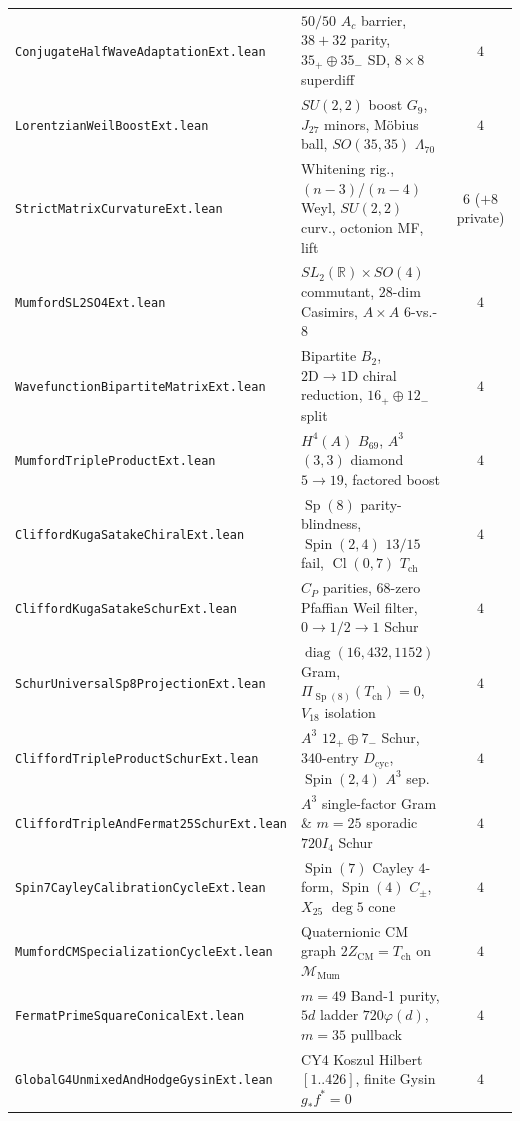 \documentclass[11pt,a4paper]{article}
\begin{document}
\begin{table}[htbp]
{\begin{tabular}{llc}
    \texttt{ConjugateHalfWaveAdaptationExt.lean} & $50/50$ $A_c$ barrier, $38{+}32$ parity, $35_+{\oplus}35_-$ SD, $8{\times}8$ superdiff & $4$ \\
    \texttt{LorentzianWeilBoostExt.lean} & $SU(2,2)$ boost $G_9$, $J_{27}$ minors, M\"obius ball, $SO(35,35)$ $\Lambda_{70}$ & $4$ \\
    \texttt{StrictMatrixCurvatureExt.lean} & Whitening rig., $(n{-}3)$/$(n{-}4)$ Weyl, $SU(2,2)$ curv., octonion MF, lift & $6$ ($+8$ private) \\
    \texttt{MumfordSL2SO4Ext.lean} & $SL_2(\mathbb{R}){\times}SO(4)$ commutant, $28$-dim Casimirs, $A{\times}A$ $6$-vs.-$8$ & $4$ \\
    \texttt{WavefunctionBipartiteMatrixExt.lean} & Bipartite $B_2$, $2\mathrm{D}\to 1\mathrm{D}$ chiral reduction, $16_+{\oplus}12_-$ split & $4$ \\
    \texttt{MumfordTripleProductExt.lean} & $H^4(A)$ $B_{69}$, $A^3$ $(3,3)$ diamond $5{\to}19$, factored boost & $4$ \\
    \texttt{CliffordKugaSatakeChiralExt.lean} & $\operatorname{Sp}(8)$ parity-blindness, $\operatorname{Spin}(2,4)$ $13/15$ fail, $\operatorname{Cl}(0,7)$ $T_{\mathrm{ch}}$ & $4$ \\
    \texttt{CliffordKugaSatakeSchurExt.lean} & $C_P$ parities, $68$-zero Pfaffian Weil filter, $0{\to}1/2{\to}1$ Schur & $4$ \\
    \texttt{SchurUniversalSp8ProjectionExt.lean} & $\operatorname{diag}(16,432,1152)$ Gram, $\Pi_{\operatorname{Sp}(8)}(T_{\mathrm{ch}})=0$, $V_{18}$ isolation & $4$ \\
    \texttt{CliffordTripleProductSchurExt.lean} & $A^3$ $12_+{\oplus}7_-$ Schur, $340$-entry $D_{\mathrm{cyc}}$, $\operatorname{Spin}(2,4)$ $A^3$ sep. & $4$ \\
    \texttt{CliffordTripleAndFermat25SchurExt.lean} & $A^3$ single-factor Gram \& $m{=}25$ sporadic $720 I_4$ Schur & $4$ \\
    \texttt{Spin7CayleyCalibrationCycleExt.lean} & $\operatorname{Spin}(7)$ Cayley $4$-form, $\operatorname{Spin}(4)$ $C_\pm$, $X_{25}$ $\deg 5$ cone & $4$ \\
    \texttt{MumfordCMSpecializationCycleExt.lean} & Quaternionic CM graph $2 Z_{\mathrm{CM}} = T_{\mathrm{ch}}$ on $\mathcal{M}_{\mathrm{Mum}}$ & $4$ \\
    \texttt{FermatPrimeSquareConicalExt.lean} & $m{=}49$ Band-1 purity, $5d$ ladder $720\varphi(d)$, $m{=}35$ pullback & $4$ \\
    \texttt{GlobalG4UnmixedAndHodgeGysinExt.lean} & CY4 Koszul Hilbert $[1..426]$, finite Gysin $g_* f^* = 0$ & $4$ \\
    \bottomrule
  \end{tabular}%
  }
\end{table}
\end{document}
